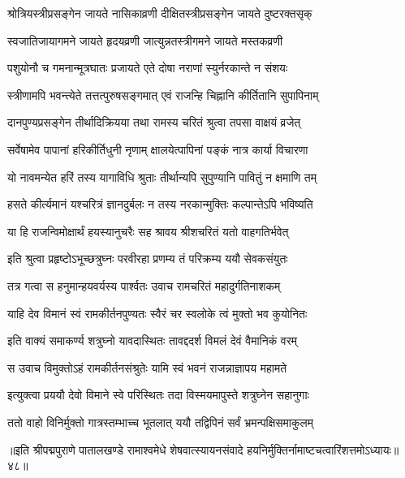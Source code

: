 \twolineshloka
{श्रोत्रियस्त्रीप्रसङ्गेन जायते नासिकाव्रणी}
{दीक्षितस्त्रीप्रसङ्गेन जायते दुष्टरक्तसृक्}%

\twolineshloka
{स्वजातिजायागमने जायते हृदयव्रणी}
{जात्युन्नतस्त्रीगमने जायते मस्तकव्रणी}%

\twolineshloka
{पशुयोनौ च गमनान्मूत्रघातः प्रजायते}
{एते दोषा नराणां स्युर्नरकान्ते न संशयः}%

\twolineshloka
{स्त्रीणामपि भवन्त्येते तत्तत्पुरुषसङ्गमात्}
{एवं राजन्हि चिह्नानि कीर्तितानि सुपापिनाम्}%

\twolineshloka
{दानपुण्यप्रसङ्गेन तीर्थादिक्रियया तथा}
{रामस्य चरितं श्रुत्वा तपसा वाक्षयं व्रजेत्}%

\twolineshloka
{सर्वेषामेव पापानां हरिकीर्तिधुनी नृणाम्}
{क्षालयेत्पापिनां पङ्कं नात्र कार्या विचारणा}%

\twolineshloka
{यो नावमन्येत हरिं तस्य यागाविधि श्रुताः}
{तीर्थान्यपि सुपुण्यानि पावितुं न क्षमाणि तम्}%

\twolineshloka
{हसते कीर्त्यमानं यश्चरित्रं ज्ञानदुर्बलः}
{न तस्य नरकान्मुक्तिः कल्पान्तेऽपि भविष्यति}%

\twolineshloka
{या हि राजन्विमोक्षार्थं हयस्यानुचरैः सह}
{श्रावय श्रीशचरितं यतो वाहगतिर्भवेत्}%


\twolineshloka
{इति श्रुत्वा प्रहृष्टोऽभूच्छत्रुघ्नः परवीरहा}
{प्रणम्य तं परिक्रम्य ययौ सेवकसंयुतः}%

\twolineshloka
{तत्र गत्वा स हनुमान्हयवर्यस्य पार्श्वतः}
{उवाच रामचरितं महादुर्गतिनाशकम्}%

\twolineshloka
{याहि देव विमानं स्वं रामकीर्तनपुण्यतः}
{स्वैरं चर स्वलोके त्वं मुक्तो भव कुयोनितः}%

\twolineshloka
{इति वाक्यं समाकर्ण्य शत्रुघ्नो यावदास्थितः}
{तावद्ददर्श विमलं देवं वैमानिकं वरम्}%

\twolineshloka
{स उवाच विमुक्तोऽहं रामकीर्तनसंश्रुतेः}
{यामि स्वं भवनं राजन्नाज्ञापय महामते}%

\twolineshloka
{इत्युक्त्वा प्रययौ देवो विमाने स्वे परिस्थितः}
{तदा विस्मयमापुस्ते शत्रुघ्नेन सहानुगाः}%

\twolineshloka
{ततो वाहो विनिर्मुक्तो गात्रस्तम्भाच्च भूतलात्}
{ययौ तद्विपिनं सर्वं भ्रमन्पक्षिसमाकुलम्}%

॥इति श्रीपद्मपुराणे पातालखण्डे रामाश्वमेधे शेषवात्स्यायनसंवादे हयनिर्मुक्तिर्नामाष्टचत्वारिंशत्तमोऽध्यायः॥४८॥



